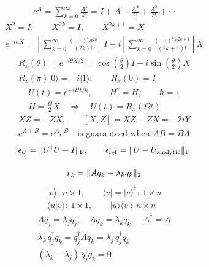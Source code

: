 \documentclass{article}
\begin{document}
\null\vfill\[\begin{gathered}
e^A=\sum_{k=0}^{\infty}\frac{A^k}{k!}=I+A+\frac{A^2}{2!}+\frac{A^3}{3!}+\cdots
\end{gathered}\]\vfill\null
\newpage
\null\vfill\[\begin{gathered}
X^2=I,\qquad X^{2k}=I,\qquad X^{2k+1}=X\\[12pt]e^{-iaX}=\left[\sum_{k=0}^\infty\frac{(-1)^ka^{2k}}{(2k)!}\right]I-i\left[\sum_{k=0}^\infty\frac{(-1)^ka^{2k+1}}{(2k+1)!}\right]X
\end{gathered}\]\vfill\null
\newpage
\null\vfill\[\begin{gathered}
R_x(\theta)=e^{-i\theta X/2}=\cos\!\left(\frac\theta2\right)I-i\sin\!\left(\frac\theta2\right)X\\[12pt]R_x(\pi)|0\rangle=-i|1\rangle,\qquad R_x(0)=I
\end{gathered}\]\vfill\null
\newpage
\null\vfill\[\begin{gathered}
U(t)=e^{-iHt/\hbar},\qquad H^\dagger=H,\qquad \hbar=1\\[12pt]H=\frac{\Omega}{2}X\quad\Longrightarrow\quad U(t)=R_x(\Omega t)
\end{gathered}\]\vfill\null
\newpage
\null\vfill\[\begin{gathered}
XZ=-ZX,\qquad [X,Z]=XZ-ZX=-2iY\\[12pt]e^{A+B}=e^Ae^B\quad\text{is guaranteed when }AB=BA
\end{gathered}\]\vfill\null
\newpage
\null\vfill\[\begin{gathered}
\epsilon_U=\|U^\dagger U-I\|_{\mathrm F},\qquad\epsilon_{\rm ref}=\|U-U_{\rm analytic}\|_{\mathrm F}\\[12pt]r_k=\|Aq_k-\lambda_kq_k\|_2
\end{gathered}\]\vfill\null
\newpage
\null\vfill\[\begin{gathered}
|v\rangle:\ n\times1,\qquad \langle v|=|v\rangle^\dagger:\ 1\times n\\[12pt]\langle u|v\rangle:\ 1\times1,\qquad |u\rangle\langle v|:\ n\times n
\end{gathered}\]\vfill\null
\newpage
\null\vfill\[\begin{gathered}
Aq_j=\lambda_jq_j,\quad Aq_k=\lambda_kq_k,\quad A^\dagger=A\\[12pt]\lambda_k\,q_j^\dagger q_k=q_j^\dagger A q_k=\lambda_j\,q_j^\dagger q_k\\[12pt](\lambda_k-\lambda_j)\,q_j^\dagger q_k=0
\end{gathered}\]\vfill\null
\end{document}
